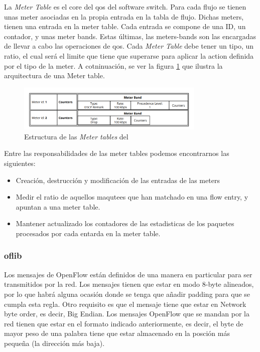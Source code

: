 La \textit{Meter Table} es el core del \gls{qos} del software switch. Para cada flujo se tienen unas meter asociadas en la propia entrada en la tabla de flujo. Dichas meters, tienen una entrada en la meter table. Cada entrada se compone de una ID, un contador, y unas meter bands. Estas últimas, las meters-bands son las encargadas de llevar a cabo las operaciones de \gls{qos}. Cada \textit{Meter Table} debe tener un tipo, un ratio, el cual será el limite que tiene que superarse para aplicar la action definida por el tipo de la meter. A cotninuación, se ver la figura \ref{fig:bofuss5} que ilustra la arquitectura de una Meter table.

\begin{figure}[ht]
    \centering
    \includegraphics[width=0.8\textwidth]{archivos/img/teoria/bofuss5.png}
    \caption{Estructura de las \textit{Meter tables} del }
    \label{fig:bofuss5}
\end{figure}

Entre las responsabilidades de las meter tables podemos encontrarnos las siguientes:

\begin{itemize}
    \item Creación, destrucción y modificación de las entradas de las meters
    \item Medir el ratio de aquellos maqutees que han matchado en una flow entry, y apuntan a una meter table.
    \item Mantener actualizado los contadores de las estadisticas de los paquetes procesados por cada entarda en la meter table.
\end{itemize}

\subsubsection{oflib}

Los mensajes de OpenFlow están definidos de una manera en particular para ser transmitidos por la red. Los mensajes tienen que estar en modo 8-byte alineados, por lo que habrá alguna ocasión donde se tenga que añadir padding para que se cumpla esta regla. Otro requisito es que el mensaje tiene que estar en Network byte order, es decir, Big Endian. Los mensajes OpenFlow que se mandan por la red tienen que estar en el formato indicado anteriormente, es decir, el byte de mayor peso de una palabra tiene que estar almacenado en la posción más pequeña (la dirección más baja).

